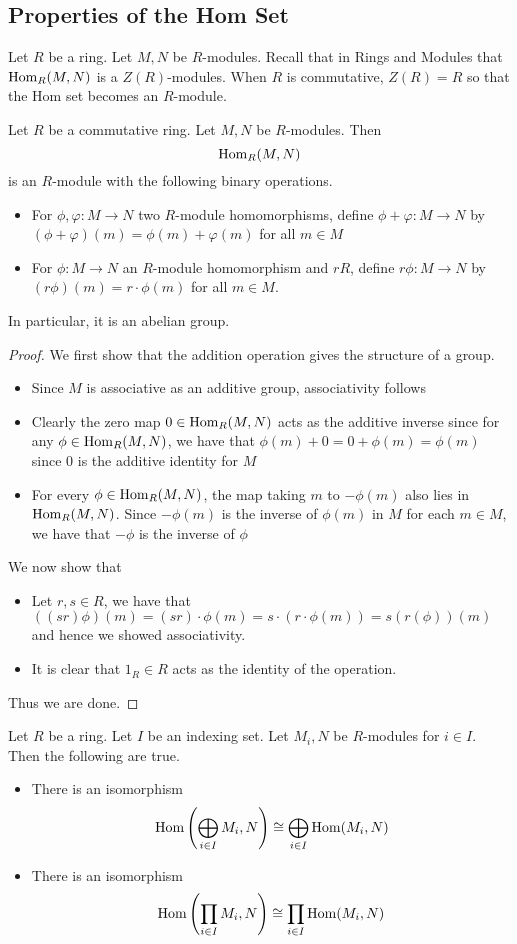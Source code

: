 \documentclass[a4paper]{article}
\begin{document}
\subsection{Properties of the Hom Set}
Let $R$ be a ring. Let $M,N$ be $R$-modules. Recall that in Rings and Modules that $\operatorname{Hom}_R(M,N)$ is a $Z(R)$-modules. When $R$ is commutative, $Z(R)=R$ so that the Hom set becomes an $R$-module. 

\begin{prp}{}{} Let $R$ be a commutative ring. Let $M,N$ be $R$-modules. Then $$\operatorname{Hom}_R(M,N)$$ is an $R$-module with the following binary operations. 
\begin{itemize}
\item For $\phi,\varphi:M\to N$ two $R$-module homomorphisms, define $\phi+\varphi:M\to N$ by $(\phi+\varphi)(m)=\phi(m)+\varphi(m)$ for all $m\in M$
\item For $\phi:M\to N$ an $R$-module homomorphism and $r R$, define $r\phi:M\to N$ by $(r\phi)(m)=r\cdot\phi(m)$ for all $m\in M$. 
\end{itemize} 
In particular, it is an abelian group. \tcbline
\begin{proof}
We first show that the addition operation gives the structure of a group. 
\begin{itemize}
\item Since $M$ is associative as an additive group, associativity follows
\item Clearly the zero map $0\in\operatorname{Hom}_R(M,N)$ acts as the additive inverse since for any $\phi\in\operatorname{Hom}_R(M,N)$, we have that $\phi(m)+0=0+\phi(m)=\phi(m)$ since $0$ is the additive identity for $M$
\item For every $\phi\in\operatorname{Hom}_R(M,N)$, the map taking $m$ to $-\phi(m)$ also lies in $\operatorname{Hom}_R(M,N)$. Since $-\phi(m)$ is the inverse of $\phi(m)$ in $M$ for each $m\in M$, we have that $-\phi$ is the inverse of $\phi$
\end{itemize}
We now show that 
\begin{itemize}
\item Let $r,s\in R$, we have that $((sr)\phi)(m)=(sr)\cdot\phi(m)=s\cdot(r\cdot\phi(m))=s(r(\phi))(m)$ and hence we showed associativity. 
\item It is clear that $1_R\in R$ acts as the identity of the operation. 
\end{itemize}
Thus we are done. 
\end{proof}
\end{prp}

\begin{prp}{}{} Let $R$ be a ring. Let $I$ be an indexing set. Let $M_i,N$ be $R$-modules for $i\in I$. Then the following are true. 
\begin{itemize}
\item There is an isomorphism $$\operatorname{Hom}\left(\bigoplus_{i\in I}M_i,N\right)\cong\bigoplus_{i\in I}\operatorname{Hom}(M_i,N)$$
\item There is an isomorphism $$\operatorname{Hom}\left(\prod_{i\in I}M_i,N\right)\cong\prod_{i\in I}\operatorname{Hom}(M_i,N)$$
\end{itemize} \tcbline
\end{prp}
\end{document}
